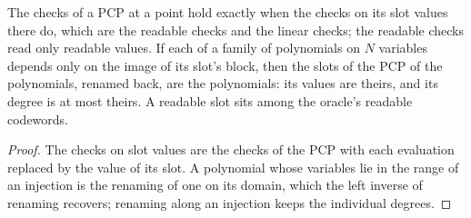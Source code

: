 \begin{lemma}
\label{lem:ar-slots}
\leanok
The checks of a PCP at a point hold exactly when the checks on its slot values there do, which are
the readable checks and the linear checks; the readable checks read only readable values. If
each of a family of polynomials on $N$ variables depends only on the image of its slot's block,
then the slots of the PCP of the polynomials, renamed back, are the polynomials: its values are
theirs, and its degree is at most theirs. A readable slot sits among the oracle's readable
codewords.
\end{lemma}

\begin{proof}
\leanok
The checks on slot values are the checks of the PCP with each evaluation replaced by the value of
its slot. A polynomial whose variables lie in the range of an injection is the renaming of one on
its domain, which the left inverse of renaming recovers; renaming along an injection keeps the
individual degrees.
\end{proof}

